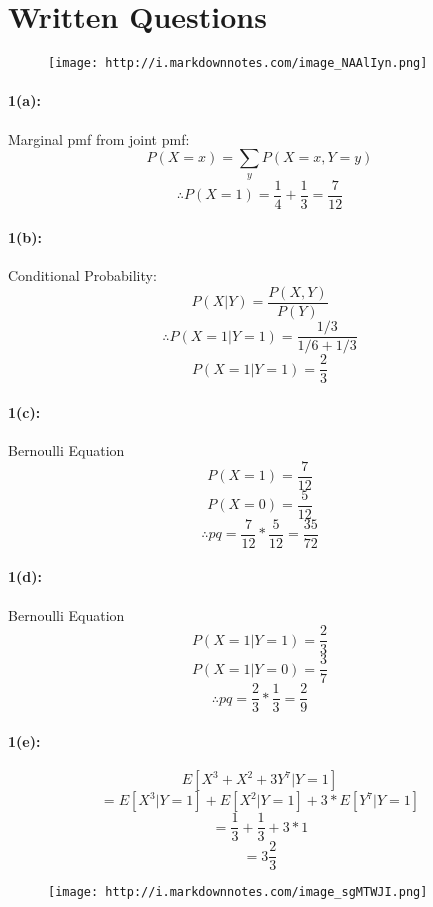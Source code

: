 \documentclass{article}
\begin{document}
    \section{Written Questions}\label{written-questions}

    \begin{figure}
\centering
\texttt{[image: http://i.markdownnotes.com/image\_NAAlIyn.png]}
\caption{}
\end{figure}

    \paragraph{1(a):}\label{a}

Marginal pmf from joint pmf: \[P(X = x) = \sum_y P(X=x,Y=y)\]
\[\therefore P(X = 1) = \frac{1}{4} + \frac{1}{3} = \frac{7}{12}\]

    \paragraph{1(b):}\label{b}

Conditional Probability: \[P(X | Y) = \frac{P(X, Y)}{P(Y)}\]
\[\therefore P(X=1 | Y = 1) = \frac{1/3}{1/6 + 1/3}\]
\[P(X=1 | Y = 1) = \frac{2}{3}\]

    \paragraph{1(c):}\label{c}

Bernoulli Equation \[P(X = 1) = \frac7{12}\] \[P(X = 0 ) = \frac5{12}\]
\[\therefore pq = \frac7{12} * \frac5{12} = \frac{35}{72}\]

    \paragraph{1(d):}\label{d}

Bernoulli Equation \[P(X = 1 | Y =1) = \frac2{3}\]
\[P(X = 1 | Y = 0 ) = \frac3{7}\]
\[\therefore pq = \frac2{3} * \frac1{3} = \frac{2}{9}\]

    \paragraph{1(e):}\label{e}

\[E[X^3 + X^2 + 3Y^7 | Y =1]\]
\[ = E[X^3 | Y = 1] + E[X^2 | Y = 1] + 3 * E[Y^7 | Y = 1] \]
\[ = \frac{1}{3} + \frac{1}{3} + 3 * 1\] \[ = 3\frac{2}{3}\]

    \begin{figure}
\centering
\texttt{[image: http://i.markdownnotes.com/image\_sgMTWJI.png]}
\caption{}
\end{figure}
\end{document}
